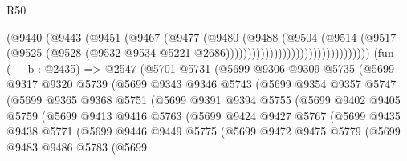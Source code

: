 \begin{lexlean}{R50}
\begin{coremodule}
                                            (@9440
                                              (@9443
                                                (@9451
                                                  (@9467
                                                    (@9477
                                                      (@9480
                                                        (@9488
                                                          (@9504
                                                            (@9514
                                                              (@9517
                                                                (@9525
                                                                  (@9528
                                                                    (@9532
                                                                      @9534
                                                                      @5221
                                                                      @2686)))))))))))))))))))))))))))))))))
    (fun (__b : @2435) =>
    @2547
      (@5701
        @5731
        (@5699
          @9306
          @9309
          @5735
          (@5699
            @9317
            @9320
            @5739
            (@5699
              @9343
              @9346
              @5743
              (@5699
                @9354
                @9357
                @5747
                (@5699
                  @9365
                  @9368
                  @5751
                  (@5699
                    @9391
                    @9394
                    @5755
                    (@5699
                      @9402
                      @9405
                      @5759
                      (@5699
                        @9413
                        @9416
                        @5763
                        (@5699
                          @9424
                          @9427
                          @5767
                          (@5699
                            @9435
                            @9438
                            @5771
                            (@5699
                              @9446
                              @9449
                              @5775
                              (@5699
                                @9472
                                @9475
                                @5779
                                (@5699
                                  @9483
                                  @9486
                                  @5783
                                  (@5699

\end{coremodule}
\end{lexlean}

